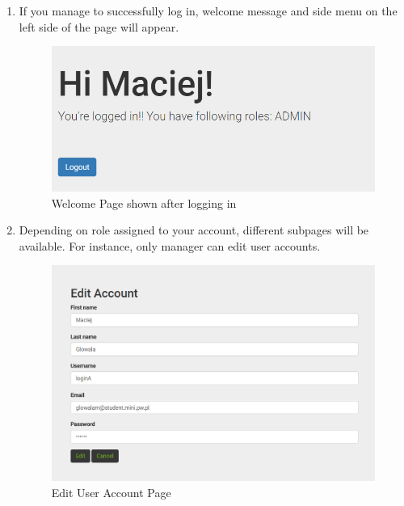 \documentclass[a4paper,11pt,twoside]{report}
\theoremstyle{definition}
\begin{document}
\begin{enumerate}
\item If you manage to successfully log in, welcome message and side menu on the left side of the page will appear.
\begin{figure}[h!]
\begin{center}
\includegraphics[width=\textwidth]{AS/login/2}
\end{center}
\caption{Welcome Page shown after logging in}
\end{figure}

\item Depending on role assigned to your account, different subpages will be available. For instance, only manager can edit user accounts.

\begin{figure}[h!]
\begin{center}
\includegraphics[width=\textwidth]{AS/login/5}
\end{center}
\caption{Edit User Account Page}
\end{figure}


\end{enumerate}
\end{document}
